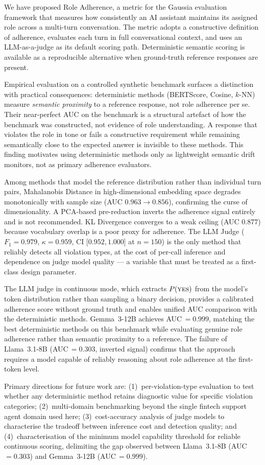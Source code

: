 \documentclass[11pt,a4paper]{article}
\begin{document}
We have proposed Role Adherence, a metric for the Gaussia evaluation framework
that measures how consistently an AI assistant maintains its assigned role
across a multi-turn conversation. The metric adopts a constructive definition of adherence, evaluates each
turn in full conversational context, and uses an LLM-as-a-judge as its
default scoring path. Deterministic semantic scoring is available as a
reproducible alternative when ground-truth reference responses are present.

Empirical evaluation on a controlled synthetic benchmark surfaces a distinction
with practical consequences: deterministic methods (BERTScore, Cosine, $k$-NN)
measure \emph{semantic proximity} to a reference response, not role adherence
per se. Their near-perfect AUC on the benchmark is a structural artefact of
how the benchmark was constructed, not evidence of role understanding. A
response that violates the role in tone or fails a constructive requirement
while remaining semantically close to the expected answer is invisible to
these methods. This finding motivates using deterministic methods only as
lightweight semantic drift monitors, not as primary adherence evaluators.

Among methods that model the reference distribution rather than individual
turn pairs, Mahalanobis Distance in high-dimensional embedding space degrades
monotonically with sample size (AUC $0.963 \to 0.856$), confirming the
curse of dimensionality. A PCA-based pre-reduction inverts the adherence signal
entirely and is not recommended. KL Divergence converges to a weak ceiling
(AUC $0.877$) because vocabulary overlap is a poor proxy for adherence.
The LLM Judge ($F_1 = 0.979$, $\kappa = 0.959$, CI [$0.952$,\,$1.000$]
at $n = 150$) is the only method that reliably detects all violation types,
at the cost of per-call inference and dependence on judge model quality ---
a variable that must be treated as a first-class design parameter.

The LLM judge in continuous mode, which extracts $P(\textsc{yes})$ from
the model's token distribution rather than sampling a binary decision,
provides a calibrated adherence score without ground truth and enables
unified AUC comparison with the deterministic methods. Gemma~3-12B achieves
AUC\,$= 0.999$, matching the best deterministic methods on this benchmark
while evaluating genuine role adherence rather than semantic proximity to a
reference. The failure of Llama~3.1-8B (AUC\,$= 0.303$, inverted signal)
confirms that the approach requires a model capable of reliably reasoning
about role adherence at the first-token level.

Primary directions for future work are: (1)~per-violation-type evaluation to
test whether any deterministic method retains diagnostic value for specific
violation categories; (2)~multi-domain benchmarking beyond the single fintech
support agent domain used here; (3)~cost-accuracy analysis of judge models
to characterise the tradeoff between inference cost and detection quality;
and (4)~characterisation of the minimum model capability threshold for
reliable continuous scoring, delimiting the gap observed between
Llama~3.1-8B (AUC\,$= 0.303$) and Gemma~3-12B (AUC\,$= 0.999$).



\end{document}
